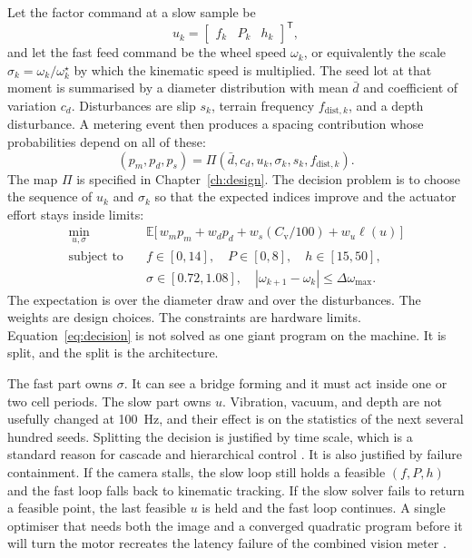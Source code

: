 Let the factor command at a slow sample be
\begin{equation}
u_k = \begin{bmatrix} f_k & P_k & h_k \end{bmatrix}^{\mathsf T},
\label{eq:uk}
\end{equation}
and let the fast feed command be the wheel speed $\omega_k$, or equivalently the scale $\sigma_k=\omega_k/\omega^{\star}_k$ by which the kinematic speed is multiplied. The seed lot at that moment is summarised by a diameter distribution with mean $\bar d$ and coefficient of variation $c_d$. Disturbances are slip $s_k$, terrain frequency $f_{\mathrm{dist},k}$, and a depth disturbance. A metering event then produces a spacing contribution whose probabilities depend on all of these:
\begin{equation}
(p_m, p_d, p_s) = \Pi(\bar d, c_d, u_k, \sigma_k, s_k, f_{\mathrm{dist},k}).
\label{eq:pi}
\end{equation}
The map $\Pi$ is specified in Chapter~\ref{ch:design}. The decision problem is to choose the sequence of $u_k$ and $\sigma_k$ so that the expected indices improve and the actuator effort stays inside limits:
\begin{equation}
\begin{aligned}
\min_{u,\sigma}\quad
& \mathbb{E}\big[\, w_m p_m + w_d p_d + w_s (C_{\mathrm{v}}/100) + w_u \ell(u) \,\big] \\
\text{subject to}\quad
& f\in[0,14],\quad P\in[0,8],\quad h\in[15,50],\\
& \sigma\in[0.72,1.08],\quad |\omega_{k+1}-\omega_k|\le \Delta\omega_{\max}.
\end{aligned}
\label{eq:decision}
\end{equation}
The expectation is over the diameter draw and over the disturbances. The weights are design choices. The constraints are hardware limits. Equation~\eqref{eq:decision} is not solved as one giant program on the machine. It is split, and the split is the architecture.

The fast part owns $\sigma$. It can see a bridge forming and it must act inside one or two cell periods. The slow part owns $u$. Vibration, vacuum, and depth are not usefully changed at 100~Hz, and their effect is on the statistics of the next several hundred seeds. Splitting the decision is justified by time scale, which is a standard reason for cascade and hierarchical control \cite{skogestad2005,astrom2008,franklin2019}. It is also justified by failure containment. If the camera stalls, the slow loop still holds a feasible $(f,P,h)$ and the fast loop falls back to kinematic tracking. If the slow solver fails to return a feasible point, the last feasible $u$ is held and the fast loop continues. A single optimiser that needs both the image and a converged quadratic program before it will turn the motor recreates the latency failure of the combined vision meter \cite{borja2021}.

